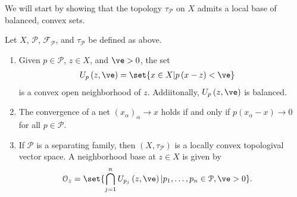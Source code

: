 \documentclass[10pt]{mypackage}
\begin{document}
We will start by showing that the topology $\tau_{\mathcal{P}}$ on $X$ admits a local base of balanced, convex sets.
\begin{theorem}
  Let $X$, $\mathcal{P}$, $\mathcal{F}_{\mathcal{P}}$, and $\tau_{\mathcal{P}}$ be defined as above.
  \begin{enumerate}[(1)]
    \item Given $p\in \mathcal{P}$, $z\in X$, and $\ve > 0$, the set
      \begin{align*}
        U_{p}\left(z,\ve\right) &= \set{x\in X| p\left(x-z\right) < \ve}
      \end{align*}
      is a convex open neighborhood of $z$. Addiitonally, $U_{p}\left(z,\ve\right)$ is balanced.
    \item The convergence of a net $\left(x_{\alpha}\right)_{\alpha}\rightarrow x$ holds if and only if $p\left(x_{\alpha}-x\right)\rightarrow 0$ for all $p\in \mathcal{P}$.
    \item If $\mathcal{P}$ is a separating family, then $\left(X,\tau_{\mathcal{P}}\right)$ is a locally convex topologival vector space. A neighborhood base at $z\in X$ is given by
      \begin{align*}
        \mathcal{O}_{z} &= \set{\bigcap_{j=1}^{n}U_{p_j}\left(z,\ve\right)| p_1,\dots,p_n\in \mathcal{P},\ve > 0}.
      \end{align*}
  \end{enumerate}
\end{theorem}
\end{document}
